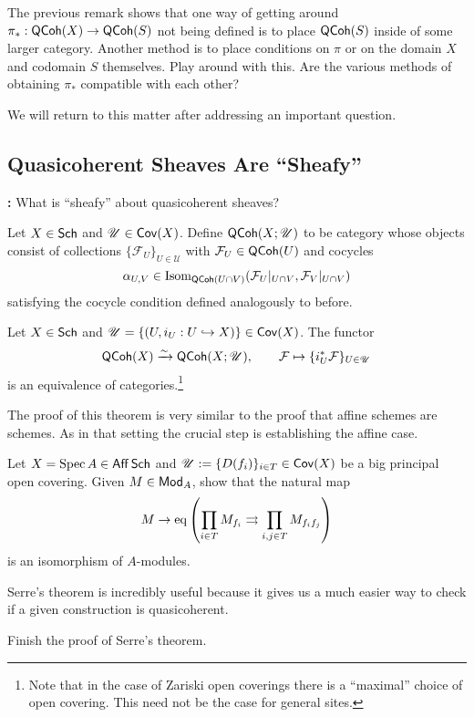 \documentclass[11pt]{article}
\renewcommand{\F}{\mathcal{F}}
\newcommand{\U}{\mathscr{U}}
\begin{document}
\begin{exercise}
The previous remark shows that one way of getting around $\pi_*: \operatorname{\mathsf{QCoh}}(X)\to\operatorname{\mathsf{QCoh}}(S)$ not being defined is to place $\operatorname{\mathsf{QCoh}}(S)$ inside of some larger category. Another method is to place conditions on $\pi$ or on the domain $X$ and codomain $S$ themselves. Play around with this. Are the various methods of obtaining $\pi_*$ compatible with each other?
\end{exercise}

We will return to this matter after addressing an important question.

\subsection{Quasicoherent Sheaves Are ``Sheafy''}
\textbf{:} What is ``sheafy'' about quasicoherent sheaves?

Let $X\in\operatorname{\mathsf{Sch}}$ and $\U\in\Cov(X)$. Define $\QCoh(X;\U)$ to be category whose objects consist of collections $\{\F_U\}_{U\in\U}$ with $\F_U\in\QCoh(U)$ and cocycles 
$$\alpha_{U,V}\in\Isom_{\QCoh(U\cap V)}(\F_U|_{U\cap V},\F_V|_{U\cap V})$$
satisfying the cocycle condition defined analogously to before.

\begin{theorem}[Serre]
Let $X\in\operatorname{\mathsf{Sch}}$ and $\U=\{(U,i_U: U\inj X)\}\in\Cov(X)$. The functor
$$\QCoh(X)\xto{\sim}\QCoh(X;\U),\qquad \F\mapsto\{i_U^*\F\}_{U\in\U}$$
is an equivalence of categories.\footnote{Note that in the case of Zariski open coverings there is a ``maximal'' choice of open covering. This need not be the case for general sites.}
\end{theorem}

The proof of this theorem is very similar to the proof that affine schemes are schemes. As in that setting the crucial step is establishing the affine case.

\begin{exercise}
Let $X=\operatorname{Spec} A\in\operatorname{\mathsf{Aff}}\operatorname{\mathsf{Sch}}$ and $\U:=\{D(f_i)\}_{i\in T}\in\Cov(X)$ be a big principal open covering. Given $M\in\operatorname{\mathsf{Mod}}_A$, show that the natural map
$$M\to\operatorname{eq}\left(\prod_{i\in T}M_{f_i}\rightrightarrows\prod_{i,j\in T}M_{f_if_j}\right)$$
is an isomorphism of $A$-modules.
\end{exercise}

Serre's theorem is incredibly useful because it gives us a much easier way to check if a given construction is quasicoherent.

\begin{exercise}
Finish the proof of Serre's theorem.
\end{exercise}
\end{document}
